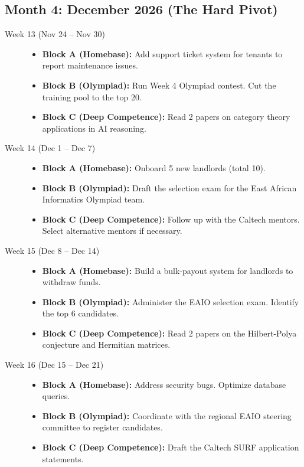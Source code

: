 \documentclass[11pt,a4paper]{article}
\begin{document}
\subsection{Month 4: December 2026 (The Hard Pivot)}
\begin{description}
    \item[Week 13 (Nov 24 -- Nov 30)] \hfill
    \begin{itemize}
        \item \textbf{Block A (Homebase):} Add support ticket system for tenants to report maintenance issues.
        \item \textbf{Block B (Olympiad):} Run Week 4 Olympiad contest. Cut the training pool to the top 20.
        \item \textbf{Block C (Deep Competence):} Read 2 papers on category theory applications in AI reasoning.
    \end{itemize}
    
    \item[Week 14 (Dec 1 -- Dec 7)] \hfill
    \begin{itemize}
        \item \textbf{Block A (Homebase):} Onboard 5 new landlords (total 10).
        \item \textbf{Block B (Olympiad):} Draft the selection exam for the East African Informatics Olympiad team.
        \item \textbf{Block C (Deep Competence):} Follow up with the Caltech mentors. Select alternative mentors if necessary.
    \end{itemize}
    
    \item[Week 15 (Dec 8 -- Dec 14)] \hfill
    \begin{itemize}
        \item \textbf{Block A (Homebase):} Build a bulk-payout system for landlords to withdraw funds.
        \item \textbf{Block B (Olympiad):} Administer the EAIO selection exam. Identify the top 6 candidates.
        \item \textbf{Block C (Deep Competence):} Read 2 papers on the Hilbert-Polya conjecture and Hermitian matrices.
    \end{itemize}
    
    \item[Week 16 (Dec 15 -- Dec 21)] \hfill
    \begin{itemize}
        \item \textbf{Block A (Homebase):} Address security bugs. Optimize database queries.
        \item \textbf{Block B (Olympiad):} Coordinate with the regional EAIO steering committee to register candidates.
        \item \textbf{Block C (Deep Competence):} Draft the Caltech SURF application statements.
    \end{itemize}
    

\end{description}
\end{document}

